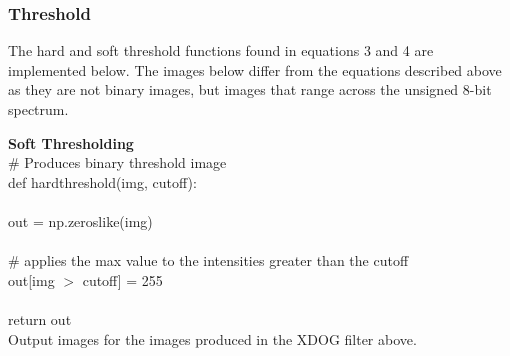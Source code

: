 \documentclass{article}
\begin{document}
			

	\subsubsection{Threshold}
		
	The hard and soft threshold functions found in equations 3 and 4 are implemented below. The images below differ from the equations described above as they are not binary images, but images that range across the unsigned 8-bit spectrum.\\
		
	\smallskip	
	
	\noindent \textbf{Soft Thresholding}\\
		
	\noindent \# Produces binary threshold image\\
	\noindent def hard\textunderscore threshold(img, cutoff):\\
	\\
	\indent out = np.zeros\textunderscore like(img)\\
	\\
	\indent \# applies the max value to the intensities greater than the cutoff\\
	\indent out[img $>$ cutoff] = 255\\
	\\	
	\indent return out\\
	
	Output images for the images produced in the XDOG filter above.\\
	
%		
%		
	
\end{document}
